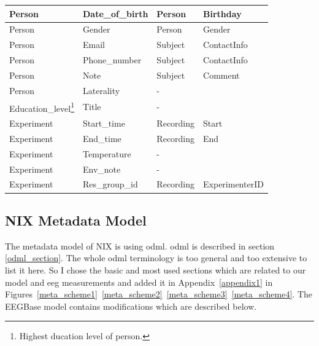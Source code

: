 \begin{longtable}{|l|l||l|l|}
	\hline Person & Date\_of\_birth & Person & Birthday \\ 
	\hline Person & Gender & Person & Gender \\ 
	\hline Person & Email & Subject & ContactInfo \\ 
	\hline Person & Phone\_number & Subject & ContactInfo \\ 
	\hline Person & Note & Subject & Comment \\ 
	\hline Person & Laterality & - &  \\ 
	\hline Education\_level\footnote{Highest ducation level of person.} &Title  & - &  \\ 
	\hline Experiment & Start\_time & Recording & Start \\ 
	\hline Experiment &End\_time  & Recording & End \\ 
	\hline  Experiment& Temperature & - &  \\ 
	\hline  Experiment& Env\_note & - &  \\ 
	\hline  Experiment& Res\_group\_id & Recording & ExperimenterID \\ 
	\hline 
\end{longtable} 


\subsection{NIX Metadata Model}

The metadata model of NIX is using \gls{odml}. \gls{odml} is described in section \ref{odml_section}. The whole \gls{odml} terminology is too general and too extensive to list it here. So I chose the basic and most used sections which are related to our model and \gls{eeg} measurements and added it in Appendix~\ref{appendix1} in Figures~\ref{meta_scheme1}~\ref{meta_scheme2}~\ref{meta_scheme3}~\ref{meta_scheme4}. The EEGBase model contains modifications which are described below. 


